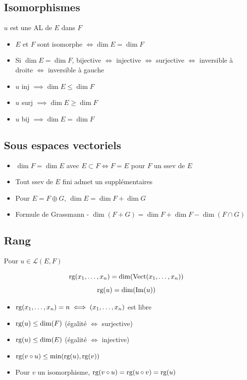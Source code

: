 \documentclass[openany]{book}
\begin{document}
\subsection{Isomorphismes}
$u$ est une AL de $E$ dans $F$
\begin{itemize}
    \item $E$ et $F$ sont isomorphe $\iff \dim E = \dim F$ 
    \item Si $\dim E = \dim F$, bijective $\iff$ injective $\iff$ surjective $\iff$ inversible à droite $\iff$ inversible à gauche
    \item $u$ inj $\implies \dim E \leq \dim F$ 
    \item $u$ surj $\implies \dim E \geq \dim F$
    \item $u$ bij $\implies \dim E = \dim F$
\end{itemize}

\subsection{Sous espaces vectoriels}
\begin{itemize}
    \item $\dim F = \dim E$ avec $E \subset F \iff F = E$ pour $F$ un ssev de $E$
    \item Tout ssev de $E$ fini admet un supplémentaires
    \item Pour $E = F \oplus G$, $\dim E = \dim F + \dim G$
    \item Formule de Grassmann - $\dim (F+G) = \dim F + \dim F - \dim (F \cap G)$ 
\end{itemize}

\subsection{Rang}
Pour $u \in \mathcal{L}(E, F)$

\[ \text{rg}(x_1,\dots,x_n) = \dim(\text{Vect}(x_1, \dots, x_n)) \]
\[ \text{rg} (u) = \dim(\text{Im}(u)) \]

\begin{itemize}
    \item $ \text{rg}(x_1,\dots,x_n) = n \iff (x_1,\dots,x_n) $ est libre
    \item $ \text{rg}(u) \leq \dim(F) $ (égalité $\iff$ surjective)
    \item $ \text{rg}(u) \leq \dim(E) $ (égalité $\iff$ injective)
    \item $ \text{rg}(v \circ u) \leq \min(\text{rg}(u), \text{rg} (v)) $
    \item Pour $v$ un isomorphisme, $ \text{rg}(v \circ u) = \text{rg}(u \circ v) = \text{rg}(u) $
\end{itemize}
\end{document}
